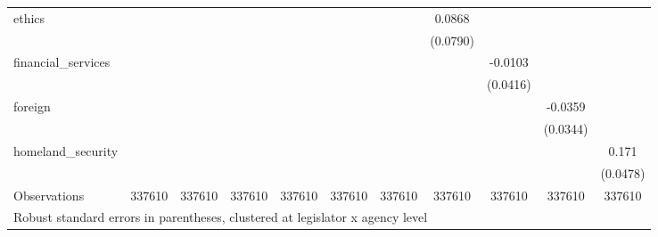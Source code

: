\begin{tabular}{l*{10}{c}}
ethics              &            &            &            &            &            &            &      0.0868&            &            &            \\
                    &            &            &            &            &            &            &    (0.0790)&            &            &            \\
financial\_services  &            &            &            &            &            &            &            &     -0.0103&            &            \\
                    &            &            &            &            &            &            &            &    (0.0416)&            &            \\
foreign             &            &            &            &            &            &            &            &            &     -0.0359&            \\
                    &            &            &            &            &            &            &            &            &    (0.0344)&            \\
homeland\_security   &            &            &            &            &            &            &            &            &            &       0.171\\
                    &            &            &            &            &            &            &            &            &            &    (0.0478)\\
\midrule
Observations        &      337610&      337610&      337610&      337610&      337610&      337610&      337610&      337610&      337610&      337610\\
\bottomrule
\multicolumn{11}{l}{\footnotesize Robust standard errors in parentheses, clustered at legislator x agency level}\\
\end{tabular}

